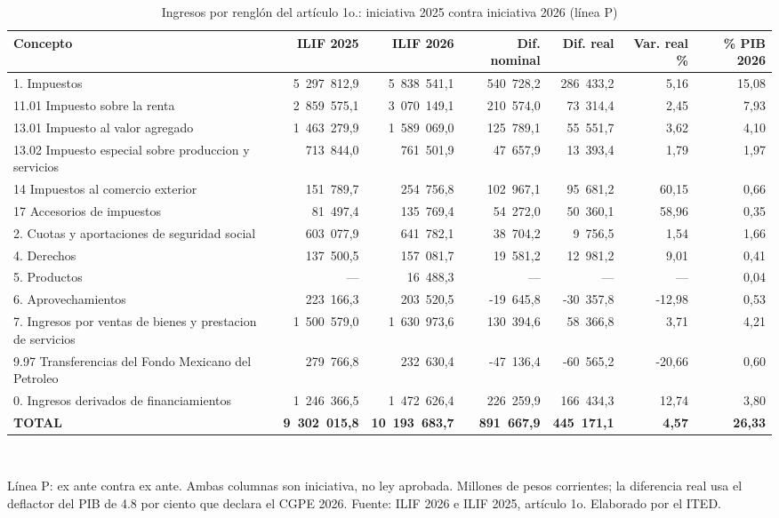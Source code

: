\begin{table}[htbp]
\centering
\scriptsize
\caption{Ingresos por renglón del artículo 1o.: iniciativa 2025 contra iniciativa 2026 (línea P)}
\label{cua:C2_1}
\begin{tabular}{p{5.4cm}rrrrrr}
\toprule
\textbf{Concepto} & \textbf{ILIF 2025} & \textbf{ILIF 2026} & \textbf{Dif. nominal} & \textbf{Dif. real} & \textbf{Var. real \%} & \textbf{\% PIB 2026} \\
\midrule
1. Impuestos & 5 297 812,9 & 5 838 541,1 & 540 728,2 & 286 433,2 & 5,16 & 15,08 \\
   11.01 Impuesto sobre la renta & 2 859 575,1 & 3 070 149,1 & 210 574,0 & 73 314,4 & 2,45 & 7,93 \\
   13.01 Impuesto al valor agregado & 1 463 279,9 & 1 589 069,0 & 125 789,1 & 55 551,7 & 3,62 & 4,10 \\
   13.02 Impuesto especial sobre produccion y servicios & 713 844,0 & 761 501,9 & 47 657,9 & 13 393,4 & 1,79 & 1,97 \\
   14 Impuestos al comercio exterior & 151 789,7 & 254 756,8 & 102 967,1 & 95 681,2 & 60,15 & 0,66 \\
   17 Accesorios de impuestos & 81 497,4 & 135 769,4 & 54 272,0 & 50 360,1 & 58,96 & 0,35 \\
2. Cuotas y aportaciones de seguridad social & 603 077,9 & 641 782,1 & 38 704,2 & 9 756,5 & 1,54 & 1,66 \\
4. Derechos & 137 500,5 & 157 081,7 & 19 581,2 & 12 981,2 & 9,01 & 0,41 \\
5. Productos & --- & 16 488,3 & --- & --- & --- & 0,04 \\
6. Aprovechamientos & 223 166,3 & 203 520,5 & -19 645,8 & -30 357,8 & -12,98 & 0,53 \\
7. Ingresos por ventas de bienes y prestacion de servicios & 1 500 579,0 & 1 630 973,6 & 130 394,6 & 58 366,8 & 3,71 & 4,21 \\
9.97 Transferencias del Fondo Mexicano del Petroleo & 279 766,8 & 232 630,4 & -47 136,4 & -60 565,2 & -20,66 & 0,60 \\
0. Ingresos derivados de financiamientos & 1 246 366,5 & 1 472 626,4 & 226 259,9 & 166 434,3 & 12,74 & 3,80 \\
\midrule
\textbf{TOTAL} & \textbf{9 302 015,8} & \textbf{10 193 683,7} & \textbf{891 667,9} & \textbf{445 171,1} & \textbf{4,57} & \textbf{26,33} \\
\bottomrule
\end{tabular}
\\[2pt]\begin{minipage}{0.92\textwidth}\scriptsize Línea P: ex ante contra ex ante. Ambas columnas son iniciativa, no ley aprobada. Millones de pesos corrientes; la diferencia real usa el deflactor del PIB de 4.8 por ciento que declara el CGPE 2026. Fuente: ILIF 2026 e ILIF 2025, artículo 1o. Elaborado por el ITED.\end{minipage}
\end{table}
